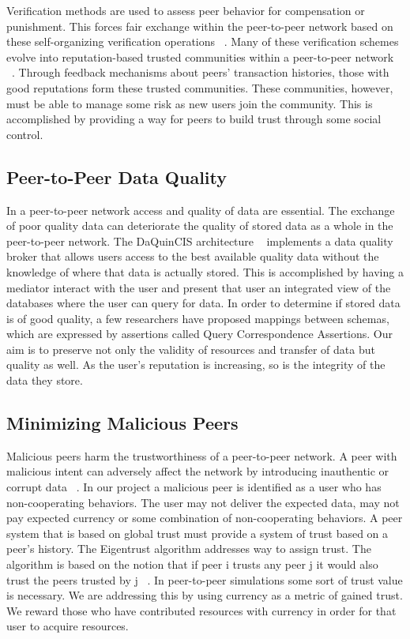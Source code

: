 \documentclass[%
				10pt,
        final,
        notitlepage,
        narroweqnarray,
        inline,
        twoside,
        ]{ieee}
\begin{document}
Verification methods are used to assess peer behavior for compensation or punishment. This forces fair exchange within the peer-to-peer network based on these self-organizing verification operations ~\cite{oualha}.  Many of these verification schemes evolve into reputation-based trusted communities within a peer-to-peer network ~\cite{xiong}.  Through feedback mechanisms about peers' transaction histories, those with good reputations form these trusted communities. These communities, however, must be able to manage some risk as new users join the community.  This is accomplished by providing a way for peers to build trust through some social control.

\subsection{Peer-to-Peer Data Quality}
In a peer-to-peer network access and quality of data are essential.  The exchange of poor quality data can deteriorate the quality of stored data as a whole in the peer-to-peer network.  The DaQuinCIS architecture ~\cite{Milano} implements a data quality broker that allows users access to the best available quality data without the knowledge of where that data is actually stored.  This is accomplished by having a mediator interact with the user and present that user an integrated view of the databases where the user can query for data.  In order to determine if stored data is of good quality, a few researchers have proposed mappings between schemas, which are expressed by assertions called Query Correspondence Assertions.  Our aim is to preserve not only the validity of resources and transfer of data but quality as well.  As the user's reputation is increasing, so is the integrity of the data they store.

\subsection{Minimizing Malicious Peers}
Malicious peers harm the trustworthiness of a peer-to-peer network.  A peer with malicious intent can adversely affect the network by introducing inauthentic or corrupt data ~\cite{kamvar}.  In our project a malicious peer is identified as a user who has non-cooperating behaviors.  The user may not deliver the expected data, may not pay expected currency or some combination of non-cooperating behaviors.  A peer system that is based on global trust must provide a system of trust based on a peer's history. The Eigentrust algorithm addresses way to assign trust.  The algorithm is based on the notion that if peer i trusts any peer j it would also trust the peers trusted by j ~\cite{kamvar}.  In peer-to-peer simulations some sort of trust value is necessary.  We are addressing this by using currency as a metric of gained trust.  We reward those who have contributed resources with currency in order for that user to acquire resources.
\end{document}
